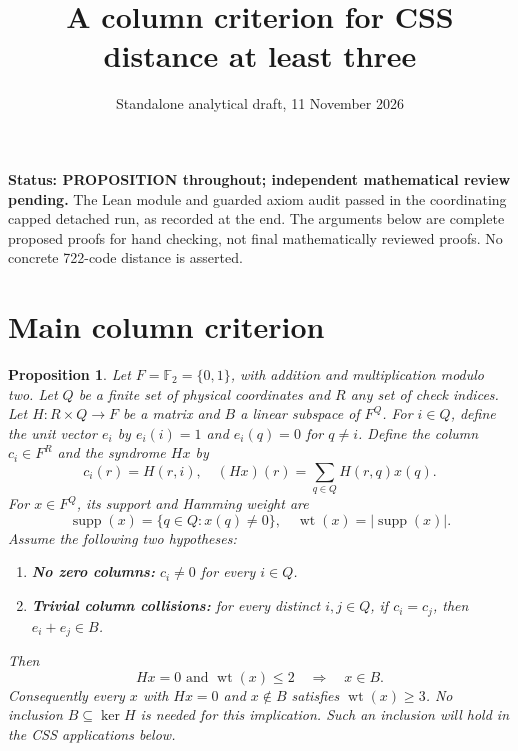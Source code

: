 \documentclass{article}
\title{A column criterion for CSS distance at least three}
\author{}
\date{Standalone analytical draft, 11 November 2026}
\newtheorem{proposition}{Proposition}
\DeclareMathOperator{\wt}{wt}
\DeclareMathOperator{\supp}{supp}
\begin{document}
\maketitle

\textbf{Status: PROPOSITION throughout; independent mathematical review pending.}
The Lean module and guarded axiom audit passed in the coordinating capped detached run, as
recorded at the end. The arguments below are complete proposed proofs for hand checking,
not final mathematically reviewed proofs. No concrete 722-code distance is asserted.

\section{Main column criterion}\label{sec:criterion}

\begin{proposition}\label{prop:criterion}
Let \(F = \mathbb{F}_2 = \{0, 1\}\), with addition and multiplication modulo two. Let \(Q\)
be a finite set of physical coordinates and \(R\) any set of check indices. Let
\(H \colon R \times Q \to F\) be a matrix and \(B\) a linear subspace of \(F^Q\). For
\(i \in Q\), define the unit vector \(e_i\) by \(e_i(i) = 1\) and \(e_i(q) = 0\) for
\(q \ne i\). Define the column \(c_i \in F^R\) and the syndrome \(Hx\) by
\begin{equation}
  c_i(r) = H(r, i), \quad (Hx)(r) = \sum_{q \in Q} H(r, q) x(q).
\end{equation}
For \(x \in F^Q\), its support and Hamming weight are
\begin{equation}
  \supp(x) = \{q \in Q : x(q) \ne 0\}, \quad \wt(x) = \lvert\supp(x)\rvert.
\end{equation}
Assume the following two hypotheses:
\begin{enumerate}
  \item \textbf{No zero columns:} \(c_i \ne 0\) for every \(i \in Q\).
  \item \textbf{Trivial column collisions:} for every distinct \(i, j \in Q\), if
    \(c_i = c_j\), then \(e_i + e_j \in B\).
\end{enumerate}
Then
\begin{equation}
  Hx = 0 \text{ and } \wt(x) \le 2 \quad \Longrightarrow \quad x \in B.
\end{equation}
Consequently every \(x\) with \(Hx = 0\) and \(x \notin B\) satisfies \(\wt(x) \ge 3\). No
inclusion \(B \subseteq \ker H\) is needed for this implication. Such an inclusion will
hold in the CSS applications below.
\end{proposition}
\end{document}
